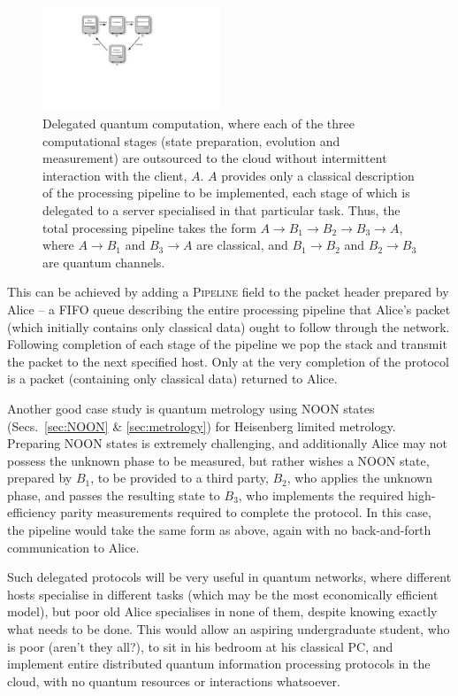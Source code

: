 \begin{figure}[!htbp]
\includegraphics[width=0.475\textwidth]{delegated}
\captionspace \caption{Delegated quantum computation, where each of the three computational stages (state preparation, evolution and measurement) are outsourced to the cloud without intermittent interaction with the client, $A$. $A$ provides only a classical description of the processing pipeline to be implemented, each stage of which is delegated to a server specialised in that particular task. Thus, the total processing pipeline takes the form \mbox{$A\to B_1\to B_2\to B_3\to A$}, where \mbox{$A\to B_1$} and \mbox{$B_3\to A$} are classical, and \mbox{$B_1\to B_2$} and \mbox{$B_2\to B_3$} are quantum channels.} \label{fig:delegated}
\end{figure}

This can be achieved by adding a \textsc{Pipeline} field to the packet header prepared by Alice -- a FIFO queue describing the entire processing pipeline that Alice's packet (which initially contains only classical data) ought to follow through the network. Following completion of each stage of the pipeline we pop the stack and transmit the packet to the next specified host. Only at the very completion of the protocol is a packet (containing only classical data) returned to Alice.

Another good case study is quantum metrology using NOON states (Secs.~\ref{sec:NOON} \& \ref{sec:metrology}) for Heisenberg limited metrology. Preparing NOON states is extremely challenging, and additionally Alice may not possess the unknown phase to be measured, but rather wishes a NOON state, prepared by $B_1$, to be provided to a third party, $B_2$, who applies the unknown phase, and passes the resulting state to $B_3$, who implements the required high-efficiency parity measurements required to complete the protocol. In this case, the pipeline would take the same form as above, again with no back-and-forth communication to Alice.

Such delegated protocols will be very useful in quantum networks, where different hosts specialise in different tasks (which may be the most economically efficient model), but poor old Alice specialises in none of them, despite knowing exactly what needs to be done. This would allow an aspiring undergraduate student, who is poor (aren't they all?), to sit in his bedroom at his classical PC, and implement entire distributed quantum information processing protocols in the cloud, with no quantum resources or interactions whatsoever.

